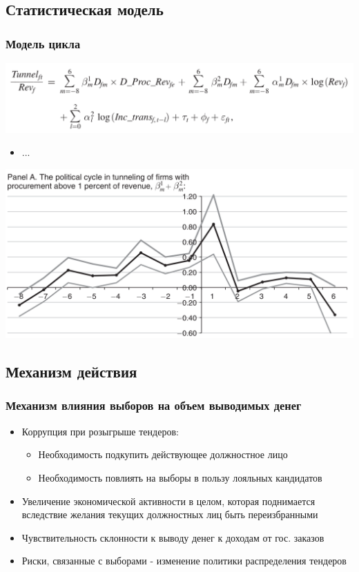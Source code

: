 \subsection{Статистическая модель}
\begin{frame}
\frametitle{Модель цикла}

\includegraphics[scale=0.18]{images/cycle1}
\begin{itemize}
\item ...
\end{itemize}
\end{frame}

\begin{frame}
\includegraphics[scale=0.2]{images/el_effect_1}

\end{frame}

\subsection{Механизм действия}

\begin{frame}
\frametitle{Механизм влияния выборов на объем выводимых денег}
\begin{itemize}
\item Коррупция при розыгрыше тендеров:
	\begin{itemize}
	\item Необходимость подкупить действующее должностное лицо
	\item Необходимость повлиять на выборы в пользу лояльных кандидатов
	\end{itemize}

\item Увеличение экономической активности в целом, которая поднимается вследствие желания текущих должностных лиц быть переизбранными

\item Чувствительность склонности к выводу денег к доходам от гос. заказов

\item Риски, связанные с выборами - изменение политики распределения тендеров
\end{itemize}
\end{frame}

